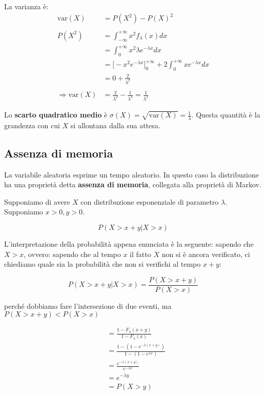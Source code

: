 \documentclass[a4paper,12pt]{book}
\newcommand\ddfrac[2]{\frac{\displaystyle #1}{\displaystyle #2}}
\begin{document}
La varianza è:
\begin{align*}
	\text{var}(X) & = P(X^2) - P(X)^2 \\
	\\
	P(X^2) & = \int_{-\infty}^{+\infty} x^2 f_\lambda(x) dx \\
	& = \int_{0}^{+\infty} x^2 \lambda e^{-\lambda x} dx \\
	& = \bigg[-x^2e^{-\lambda x} \bigg]_0^{+\infty} + 2\int_0^{+\infty} x e^{-\lambda x} dx \\
	& = 0 + \frac{2}{\lambda^2} \\
	\\
	\Rightarrow \text{var}(X) & = \frac{2}{\lambda^2} - \frac{1}{\lambda^2} = \frac{1}{\lambda^2}
\end{align*}

Lo \textbf{scarto quadratico medio} è $\sigma(X) = \sqrt{\text{var}(X)} = \ddfrac{1}{\lambda}$. 
Questa quantità è la grandezza con cui $ X $ si allontana dalla sua attesa. 

\subsection{Assenza di memoria}

La variabile aleatoria esprime un tempo aleatorio. In questo caso la distribuzione ha una proprietà detta \textbf{assenza di memoria}, collegata alla proprietà di Markov. 

Supponiamo di avere $ X $ con distribuzione esponenziale di parametro $\lambda$. Supponiamo $ x > 0, y > 0 $.

$$ P(X > x + y | X > x) $$

L'interpretazione della probabilità appena enunciata è la seguente: sapendo che $ X > x $, ovvero: sapendo che al tempo $ x $ il fatto $ X $ non si è ancora verificato, ci chiediamo quale sia la probabilità che non si verifichi al tempo $ x+y $:

$$ P(X > x + y | X > x) = \frac{P(X>x+y)}{P(X > x)}$$

perché dobbiamo fare l'intersezione di due eventi, ma $ P(X>x+y) < P(X>x) $

\begin{align*}
	& = \frac{1 - F_\lambda (x+y)}{1-F_\lambda(x)} \\
	& = \frac{1- (1-e^{-\lambda(x+y)})}{1-(1-e^{\lambda x})} \\
	& = \frac{e^{-\lambda(x+y)}}{e^{-\lambda x}} \\
	& = e^{-\lambda y} \\
	& = P(X > y)
\end{align*}
\end{document}
